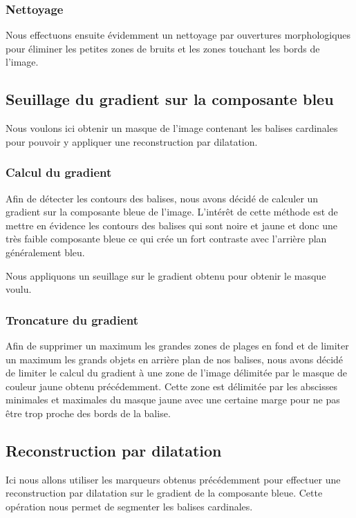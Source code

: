 \documentclass{article}
\begin{document}
\subsubsection{Nettoyage}
Nous effectuons ensuite évidemment un nettoyage par ouvertures morphologiques
pour éliminer les petites zones de bruits et les zones touchant les bords de
l'image.

\subsection{Seuillage du gradient sur la composante bleu}

Nous voulons ici obtenir un masque de l'image contenant les balises cardinales
pour pouvoir y appliquer une reconstruction par dilatation.

\subsubsection{Calcul du gradient}
Afin de détecter les contours des balises, nous avons décidé de calculer un
gradient sur la composante bleue de l'image. L'intérêt de cette méthode est de
mettre en évidence les contours des balises qui sont noire et jaune et donc une
très faible composante bleue ce qui crée un fort contraste avec l'arrière plan
généralement bleu.

Nous appliquons un seuillage sur le gradient obtenu pour obtenir le masque
voulu.

\subsubsection{Troncature du gradient}
Afin de supprimer un maximum les grandes zones de plages en fond et de limiter
un maximum les grands objets en arrière plan de nos balises, nous avons décidé
de limiter le calcul du gradient à une zone de l'image délimitée par le masque
de couleur jaune obtenu précédemment. Cette zone est délimitée par les
abscisses minimales et maximales du masque jaune avec une certaine marge pour
ne pas être trop proche des bords de la balise.

\subsection{Reconstruction par dilatation}

Ici nous allons utiliser les marqueurs obtenus précédemment pour effectuer une
reconstruction par dilatation sur le gradient de la composante bleue. Cette
opération nous permet de segmenter les balises cardinales.
\end{document}
